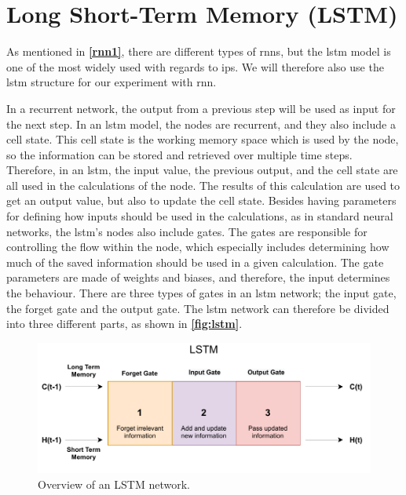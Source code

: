 \section{Long Short-Term Memory (LSTM)}

As mentioned in \textbf{\autoref{rnn1}}, there are different types of \gls{rnn}s, but the \gls{lstm} model is one of the most widely used with regards to \gls{ips}. We will therefore also use the \gls{lstm} structure for our experiment with \gls{rnn}.

In a recurrent network, the output from a previous step will be used as input for the next step. In an \gls{lstm} model, the nodes are recurrent, and they also include a cell state. This cell state is the working memory space which is used by the node, so the information can be stored and retrieved over multiple time steps. Therefore, in an \gls{lstm}, the input value, the previous output, and the cell state are all used in the calculations of the node. The results of this calculation are used to get an output value, but also to update the cell state. Besides having parameters for defining how inputs should be used in the calculations, as in standard neural networks, the \gls{lstm}'s nodes also include gates. The gates are responsible for controlling the flow within the node, which especially includes determining how much of the saved information should be used in a given calculation. The gate parameters are made of weights and biases, and therefore, the input determines the behaviour. There are three types of gates in an \gls{lstm} network; the input gate, the forget gate and the output gate. The \gls{lstm} network can therefore be divided into three different parts, as shown in \textbf{\autoref{fig:lstm}}. 

\begin{figure}[H]
    \centering
    \includegraphics[scale=0.85]{Images/Experiments/lstm.pdf}
    \caption{Overview of an LSTM network.}
    \label{fig:lstm}
\end{figure}

